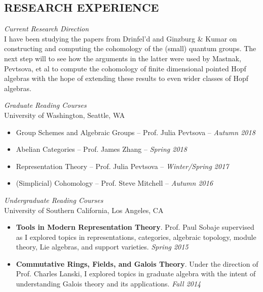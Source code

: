 \documentclass[margin, 10pt]{res} %
\begin{document}
\begin{resume}
\section{RESEARCH EXPERIENCE}

{\sl Current Research Direction}\\
I have been studying the papers from Drinfel'd and Ginzburg \& Kumar on constructing and computing
the cohomology of the (small) quantum groups. The next step will to see how the arguments in the latter
were used by Mastnak, Pevtsova, et al to compute the cohomology of finite dimensional pointed Hopf algebras
with the hope of extending these results to even wider classes of Hopf algebras.

{\sl Graduate Reading Courses} \\
University of Washington, Seattle, WA
\begin{itemize} \itemsep -1pt %
	\item Group Schemes and Algebraic Groups -- Prof. Julia Pevtsova -- {\sl Autumn 2018}
	\item Abelian Categories -- Prof. James Zhang -- {\sl Spring 2018}
	\item Representation Theory -- Prof. Julia Pevtsova -- {\sl Winter/Spring 2017}
	\item (Simplicial) Cohomology -- Prof. Steve Mitchell -- {\sl Autumn 2016}
\end{itemize}

{\sl Undergraduate Reading Courses}\\
University of Southern California, Los Angeles, CA
\begin{itemize} \itemsep -1pt %
	\item {\bfseries Tools in Modern Representation Theory}. Prof. Paul Sobaje supervised as I explored topics in representations, categories, algebraic topology, module theory, Lie algebras, and support varieties. {\sl Spring 2015}
	\item {\bfseries Commutative Rings, Fields, and Galois Theory}. Under the direction of Prof. Charles Lanski, I explored topics in graduate algebra with the intent of understanding Galois theory and its applications. {\sl Fall 2014}
\end{itemize}


 

\end{resume}
\end{document}
